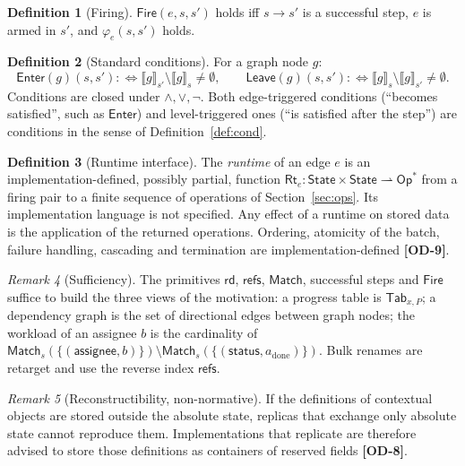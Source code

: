 \documentclass[11pt,a4paper]{article}
\theoremstyle{definition}
\newtheorem{definition}{Definition}[section]
\theoremstyle{plain}
\theoremstyle{remark}
\newtheorem{remark}[definition]{Remark}
\newcommand{\od}[1]{\textsf{\textbf{\textcolor{BrickRed}{[OD-#1]}}}}
\newcommand{\Stt}{\mathsf{State}}
\newcommand{\pfun}{\rightharpoonup}
\newcommand{\rd}{\mathsf{rd}}
\newcommand{\refs}{\mathsf{refs}}
\newcommand{\Match}{\mathsf{Match}}
\newcommand{\Fire}{\mathsf{Fire}}
\newcommand{\Enter}{\mathsf{Enter}}
\newcommand{\Leave}{\mathsf{Leave}}
\begin{document}
\begin{definition}[Firing]\label{def:fire}
$\Fire(e,s,s')$ holds iff $s\to s'$ is a successful step, $e$ is armed in $s'$, and $\varphi_e(s,s')$ holds.
\end{definition}

\begin{definition}[Standard conditions]\label{def:std}
For a graph node $g$:
\[
\Enter(g)(s,s'):\iff \llbracket g\rrbracket_{s'}\setminus\llbracket g\rrbracket_s\neq\emptyset,\qquad
\Leave(g)(s,s'):\iff \llbracket g\rrbracket_s\setminus\llbracket g\rrbracket_{s'}\neq\emptyset.
\]
Conditions are closed under $\wedge,\vee,\neg$. Both edge-triggered conditions (``becomes satisfied'', such as $\Enter$) and
level-triggered ones (``is satisfied after the step'') are conditions in the sense of Definition~\ref{def:cond}.
\end{definition}

\begin{definition}[Runtime interface]\label{def:runtime}
The \emph{runtime} of an edge $e$ is an implementation-defined, possibly partial, function
$\mathsf{Rt}_e:\Stt\times\Stt\pfun\mathsf{Op}^{*}$ from a firing pair to a finite sequence of operations of Section~\ref{sec:ops}.
Its implementation language is not specified. Any effect of a runtime on stored data is the application of the returned operations.
Ordering, atomicity of the batch, failure handling, cascading and termination are implementation-defined \od{9}.
\end{definition}

\begin{remark}[Sufficiency]\label{rem:suff}
The primitives $\rd$, $\refs$, $\Match$, successful steps and $\Fire$ suffice to build the three views of the motivation:
a progress table is $\mathsf{Tab}_{x,P}$; a dependency graph is the set of directional edges between graph nodes;
the workload of an assignee $b$ is the cardinality of $\Match_s(\{(\mathsf{assignee},b)\})\setminus\Match_s(\{(\mathsf{status},a_{\mathrm{done}})\})$.
Bulk renames are \textsf{retarget} and use the reverse index $\refs$.
\end{remark}

\begin{remark}[Reconstructibility, non-normative]\label{rem:recon}
If the definitions of contextual objects are stored outside the absolute state, replicas that exchange only absolute state cannot reproduce them.
Implementations that replicate are therefore advised to store those definitions as containers of reserved fields \od{8}.
\end{remark}
\end{document}
